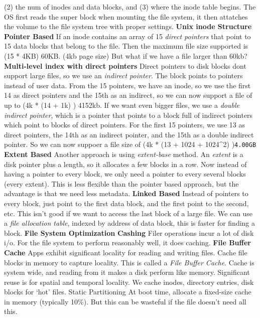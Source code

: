 (2) the num of inodes and data blocks, and (3) where the inode table begins.
The OS first reads the super block when mounting the file system, it
then attatches the volume to the file system tree with proper settings.
{\bf Unix inode Structure}
{\bf Pointer Based}
If an inode contains an array of 15 \emph{direct pointers} that point to
15 data blocks that belong to the file. Then the maximum file size
supported is (15 * 4KB) 60KB. (4kb page size)
But what if we have a file larger than 60kb?
{\bf Multi-level index with direct
pointers}
Direct pointers to disk blocks dont support large files, so we use an
\emph{indirect pointer}. The block points to pointers instead of user
data.
From the 15 pointers, we have an inode, so we use the first 14 as direct
pointers and the 15th as an indirect, so we can now support a file of up
to (4k * (14 + 1k) ) 4152kb.
If we want even bigger files, we use a \emph{double indirect pointer},
which is a pointer that points to a block full of indirect pointers
which point to blocks of direct pointers.
For the first 15 pointers, we use 13 as direct pointers, the 14th as an
indirect pointer, and the 15th as a double indirect pointer. So we can
now suppoer a file size of (4k * (13 + 1024 + 1024\^{}2)
)\texttt{4.00GB}
{\bf Extent Based}
Another approach is using \emph{extent-base} method. An \emph{extent} is
a disk pointer plus a length, so it allocates a few blocks in a row. Now
instead of having a pointer to every block, we only need a pointer to
every several blocks (every extent). This is less flexible than the
pointer based approach, but the advantage is that we need less metadata.
{\bf Linked Based}
Instead of pointers to every block, just point to the first data block,
and the first point to the second, etc. This isn't good if we want to
access the last block of a large file.
We can use a \emph{file allocation table}, indexed by address of data
block, this is faster for finding a block.
{\bf File System Optimization}
{\bf Cashing}
Filer operations incur a lot of disk i/o. For the file system to perform
reasonably well, it does caching.
{\bf File Buffer Cache}
Apps exhibit significant locality for reading and writing files. Cache
file blocks in memory to capture locality. This is called a \emph{File
Buffer Cache}.
Cache is system wide, and reading from it makes a disk perform like
memory. Significant reuse is for spatial and temporal locality.
We cache inodes, directory entries, disk blocks for `hot' files.
Static Partitioning
At boot time, allocate a fixed-size cache in memory (typically 10\%).
But this can be wasteful if the file doesn't need all this.
